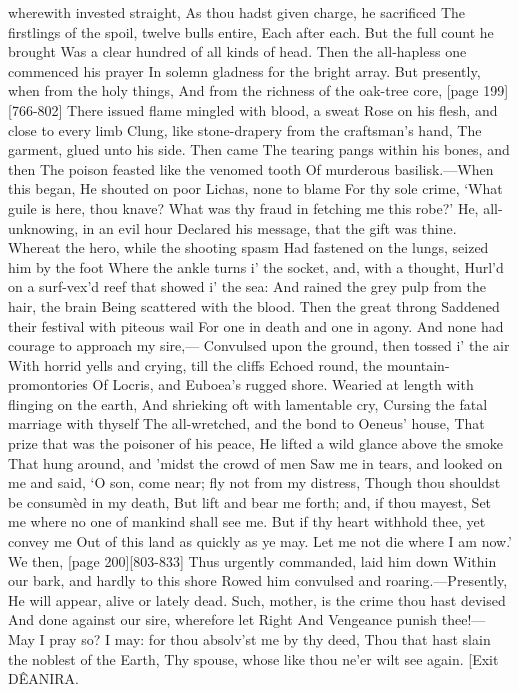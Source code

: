 \documentclass[11pt,letter]{book}
\begin{document}
\par   wherewith invested straight, As thou hadst given charge, he sacrificed The firstlings of the spoil, twelve bulls entire, Each after each. But the full count he brought Was a clear hundred of all kinds of head. Then the all-hapless one commenced his prayer In solemn gladness for the bright array. But presently, when from the holy things, And from the richness of the oak-tree core, [page 199][766-802] There issued flame mingled with blood, a sweat Rose on his flesh, and close to every limb Clung, like stone-drapery from the craftsman’s hand, The garment, glued unto his side. Then came The tearing pangs within his bones, and then The poison feasted like the venomed tooth Of murderous basilisk.—When this began, He shouted on poor Lichas, none to blame For thy sole crime, ‘What guile is here, thou knave? What was thy fraud in fetching me this robe?’ He, all-unknowing, in an evil hour Declared his message, that the gift was thine. Whereat the hero, while the shooting spasm Had fastened on the lungs, seized him by the foot Where the ankle turns i’ the socket, and, with a thought, Hurl’d on a surf-vex’d reef that showed i’ the sea:  And rained the grey pulp from the hair, the brain Being scattered with the blood. Then the great throng Saddened their festival with piteous wail For one in death and one in agony. And none had courage to approach my sire,— Convulsed upon the ground, then tossed i’ the air With horrid yells and crying, till the cliffs Echoed round, the mountain-promontories Of Locris, and Euboea’s rugged shore. Wearied at length with flinging on the earth, And shrieking oft with lamentable cry, Cursing the fatal marriage with thyself The all-wretched, and the bond to Oeneus’ house, That prize that was the poisoner of his peace, He lifted a wild glance above the smoke That hung around, and ’midst the crowd of men Saw me in tears, and looked on me and said, ‘O son, come near; fly not from my distress, Though thou shouldst be consumèd in my death, But lift and bear me forth; and, if thou mayest, Set me where no one of mankind shall see me. But if thy heart withhold thee, yet convey me Out of this land as quickly as ye may. Let me not die where I am now.’ We then, [page 200][803-833] Thus urgently commanded, laid him down Within our bark, and hardly to this shore Rowed him convulsed and roaring.—Presently, He will appear, alive or lately dead. Such, mother, is the crime thou hast devised And done against our sire, wherefore let Right And Vengeance punish thee!—May I pray so? I may:  for thou absolv’st me by thy deed, Thou that hast slain the noblest of the Earth, Thy spouse, whose like thou ne’er wilt see again. [Exit DÊANIRA.
\end{document}
